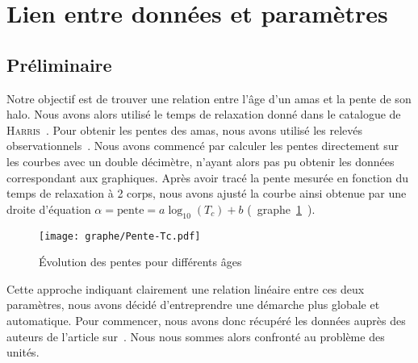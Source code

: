 	\section[Lien]{Lien entre données et paramètres\label{amas}}

\subsection{Préliminaire}
	Notre objectif est de trouver une relation entre l'âge d'un amas et la pente de son halo.
	Nous avons alors utilisé le temps de relaxation donné dans le catalogue de \textsc{Harris}~\cite{Harris}.
	Pour obtenir les pentes des amas, nous avons utilisé les relevés observationnels~\cite{Trager-graphe}. %
	Nous avons commencé par calculer les pentes directement sur les courbes avec un double décimètre, n'ayant alors pas pu obtenir les données correspondant aux graphiques.
	Après avoir tracé la pente mesurée en fonction du temps de relaxation à 2 corps, nous avons ajusté la
	courbe ainsi obtenue par une droite d'équation $ \alpha = \mathrm{pente} = a \log_{10}(T_c) + b$ (~graphe~\ref{Pente-lin}~).
	\begin{figure}[hbt!]
		\centering \texttt{[image: graphe/Pente-Tc.pdf]}
		\caption{Évolution des pentes pour différents âges}
		\label{Pente-lin}
	\end{figure}

	Cette approche indiquant clairement une relation linéaire entre ces deux paramètres, nous avons décidé d'entreprendre une démarche plus globale et automatique.
	Pour commencer, nous avons donc récupéré les données auprès des auteurs de l'article sur~\cite{TragerTable}. Nous nous sommes alors confronté au problème des unités.

